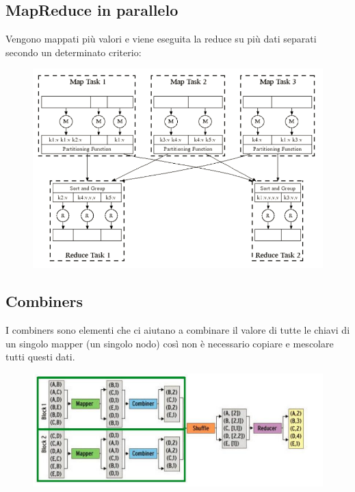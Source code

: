 \subsection{MapReduce in parallelo}
Vengono mappati più valori e viene eseguita la reduce su più dati separati secondo un determinato criterio: 
\begin{figure}[th]
    \centering
    \includegraphics[scale=0.5]{MapReduce/img/MapReduceParallel.png}
    \label{fig:mapreduceparallel}
\end{figure}

\subsection{Combiners}
I combiners sono elementi che ci aiutano a combinare il valore di tutte le chiavi di un singolo mapper (un singolo nodo) così non è necessario copiare e mescolare tutti questi dati. 
\begin{figure}[th]
    \centering
    \includegraphics[scale=0.5]{MapReduce/img/Combiners.png}
    \label{fig:combiners}
\end{figure}

